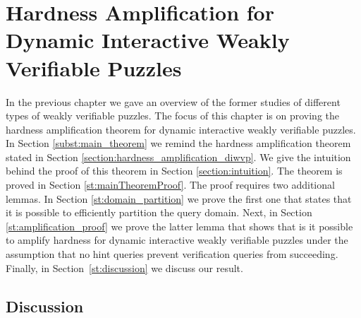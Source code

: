 \documentclass[11pt,a4paper,titlepage]{memoir}
\begin{document}
\chapter{Hardness Amplification for Dynamic Interactive Weakly Verifiable Puzzles}
\label{ch:main_result} %
In the previous chapter we gave an overview of the former studies of different types of weakly verifiable puzzles.
The focus of this chapter is on proving the hardness amplification theorem for dynamic interactive weakly verifiable puzzles.
In Section \ref{subst:main_theorem} we remind the hardness amplification theorem stated in Section \ref{section:hardness_amplification_diwvp}.
We give the intuition behind the proof of this theorem in Section \ref{section:intuition}.
The theorem is proved in Section \ref{st:mainTheoremProof}. The proof requires two additional lemmas.
In Section \ref{st:domain_partition} we prove the first one that states that it is possible to efficiently partition the query domain.
Next, in Section \ref{st:amplification_proof} we prove the latter lemma that shows that is it possible to amplify hardness for dynamic interactive weakly
verifiable puzzles under the assumption that no hint queries prevent verification queries from succeeding.
Finally, in Section~\ref{st:discussion} we discuss our result.
%





%
\section{Discussion}
\label{ch:discussion}


\appendix


\backmatter



\end{document}
